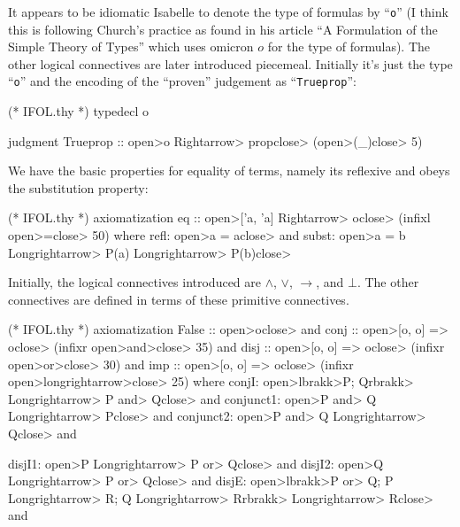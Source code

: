 \begin{node}[Formulas]\label{isabelle:fol-0001}%
It appears to be idiomatic Isabelle to denote the type of formulas by
``\texttt{o}'' (I think this is following Church's practice as found in
his article ``A Formulation of the Simple Theory of Types'' which uses
omicron $o$ for the type of formulas). 
The other logical connectives are later introduced piecemeal.
Initially it's just the type ``\texttt{o}'' and the encoding of the ``proven'' judgement as ``\texttt{Trueprop}'':
\begin{Isabelle}
(* IFOL.thy *)
typedecl o

judgment
  Trueprop :: \<open>o \<Rightarrow> prop\<close>  (\<open>(_)\<close> 5)
\end{Isabelle}

\begin{node}[Equality]\label{isabelle:fol-0006}%
We have the basic properties for equality of terms, namely its reflexive
and obeys the substitution property:
\begin{Isabelle}
(* IFOL.thy *)
axiomatization
  eq :: \<open>['a, 'a] \<Rightarrow> o\<close>  (infixl \<open>=\<close> 50)
where
  refl: \<open>a = a\<close> and
  subst: \<open>a = b \<Longrightarrow> P(a) \<Longrightarrow> P(b)\<close>
\end{Isabelle}
\end{node}

\begin{node}[Connectives]\label{isabelle:fol-0004}%
Initially, the logical connectives introduced are $\land$, $\lor$,
$\longrightarrow$, and $\bot$. The other connectives are defined in
terms of these primitive connectives.
\begin{Isabelle}
(* IFOL.thy *)
axiomatization
  False :: \<open>o\<close> and
  conj :: \<open>[o, o] => o\<close>  (infixr \<open>\<and>\<close> 35) and
  disj :: \<open>[o, o] => o\<close>  (infixr \<open>\<or>\<close> 30) and
  imp :: \<open>[o, o] => o\<close>  (infixr \<open>\<longrightarrow>\<close> 25)
where
  conjI: \<open>\<lbrakk>P;  Q\<rbrakk> \<Longrightarrow> P \<and> Q\<close> and
  conjunct1: \<open>P \<and> Q \<Longrightarrow> P\<close> and
  conjunct2: \<open>P \<and> Q \<Longrightarrow> Q\<close> and

  disjI1: \<open>P \<Longrightarrow> P \<or> Q\<close> and
  disjI2: \<open>Q \<Longrightarrow> P \<or> Q\<close> and
  disjE: \<open>\<lbrakk>P \<or> Q; P \<Longrightarrow> R; Q \<Longrightarrow> R\<rbrakk> \<Longrightarrow> R\<close> and


\end{Isabelle}
\end{node}
\end{node}
